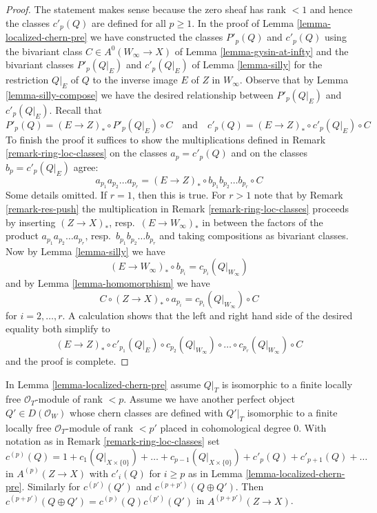 \begin{proof}
The statement makes sense because the zero sheaf has rank $< 1$ and
hence the classes $c'_p(Q)$ are defined for all $p \geq 1$.
In the proof of Lemma \ref{lemma-localized-chern-pre} we have constructed
the classes $P'_p(Q)$ and $c'_p(Q)$ using the bivariant class
$C \in A^0(W_\infty \to X)$ of Lemma \ref{lemma-gysin-at-infty}
and the bivariant classes
$P'_p(Q|_E)$ and $c'_p(Q|_E)$ of Lemma \ref{lemma-silly} for the restriction
$Q|_E$ of $Q$ to the inverse image $E$ of $Z$ in $W_\infty$.
Observe that by Lemma \ref{lemma-silly-compose} we have the desired
relationship between $P'_p(Q|_E)$ and $c'_p(Q|_E)$. Recall that
$$
P'_p(Q) = (E \to Z)_* \circ P'_p(Q|_E) \circ C
\quad\text{and}\quad
c'_p(Q) = (E \to Z)_* \circ c'_p(Q|_E) \circ C
$$
To finish the proof it suffices to show the multiplications defined
in Remark \ref{remark-ring-loc-classes} on the classes $a_p = c'_p(Q)$
and on the classes $b_p = c'_p(Q|_E)$ agree:
$$
a_{p_1}a_{p_2} \ldots a_{p_r} =
(E \to Z)_* \circ b_{p_1}b_{p_2} \ldots b_{p_r} \circ C
$$
Some details omitted. If $r = 1$, then this is true.
For $r > 1$ note that by Remark \ref{remark-res-push} the multiplication in
Remark \ref{remark-ring-loc-classes} proceeds
by inserting $(Z \to X)_*$, resp.\ $(E \to W_\infty)_*$ in between
the factors of the product
$a_{p_1}a_{p_2} \ldots a_{p_r}$, resp.\ $b_{p_1}b_{p_2} \ldots b_{p_r}$
and taking compositions as bivariant classes.
Now by Lemma \ref{lemma-silly} we have
$$
(E \to W_\infty)_* \circ b_{p_i} = c_{p_i}(Q|_{W_\infty})
$$
and by Lemma \ref{lemma-homomorphism} we have
$$
C \circ (Z \to X)_* \circ a_{p_i} = c_{p_i}(Q|_{W_\infty}) \circ C
$$
for $i = 2, \ldots, r$. A calculation
shows that the left and right hand side of the desired
equality both simplify to
$$
(E \to Z)_* \circ c'_{p_1}(Q|_E) \circ
c_{p_2}(Q|_{W_\infty}) \circ \ldots \circ
c_{p_r}(Q|_{W_\infty}) \circ C
$$
and the proof is complete.
\end{proof}

\begin{lemma}
\label{lemma-localized-chern-pre-sum-c}
In Lemma \ref{lemma-localized-chern-pre} assume $Q|_T$ is isomorphic
to a finite locally free $\mathcal{O}_T$-module of rank $< p$.
Assume we have another perfect object $Q' \in D(\mathcal{O}_W)$
whose chern classes are defined with $Q'|_T$ isomorphic to a
finite locally free $\mathcal{O}_T$-module of rank $< p'$ placed
in cohomological degree $0$. With notation as in
Remark \ref{remark-ring-loc-classes} set
$$
c^{(p)}(Q) = 1 + c_1(Q|_{X \times \{0\}}) + \ldots +
c_{p - 1}(Q|_{X \times \{0\}}) +
c'_{p}(Q) + c'_{p + 1}(Q) + \ldots
$$
in $A^{(p)}(Z \to X)$ with $c'_i(Q)$ for $i \geq p$ as in
Lemma \ref{lemma-localized-chern-pre}. Similarly for $c^{(p')}(Q')$ and
$c^{(p + p')}(Q \oplus Q')$.
Then $c^{(p + p')}(Q \oplus Q') = c^{(p)}(Q)c^{(p')}(Q')$
in $A^{(p + p')}(Z \to X)$.
\end{lemma}

